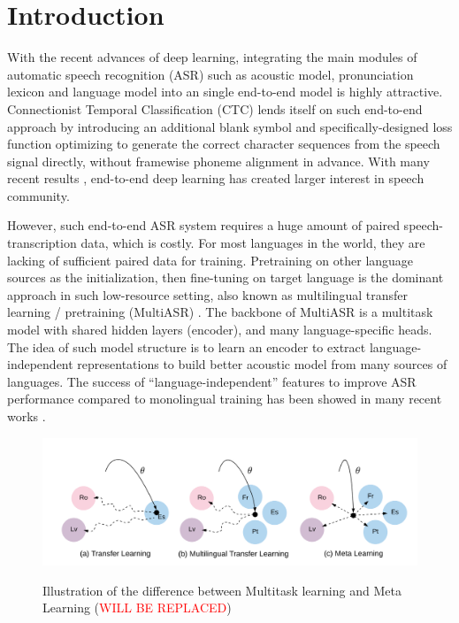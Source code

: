 \section{Introduction}
With the recent advances of deep learning, integrating the main modules of automatic speech recognition (ASR) such as acoustic model, pronunciation lexicon and language model into an single end-to-end model is highly attractive. Connectionist Temporal Classification (CTC) \cite{graves2006connectionist} lends itself on such end-to-end approach by introducing an additional blank symbol and specifically-designed loss function optimizing to generate the correct character sequences from the speech signal directly, without framewise phoneme alignment in advance. With many recent results \cite{hannun2014deep, amodei2016deep, collobert2016wav2letter}, end-to-end deep learning has created larger interest in speech community.

However, such end-to-end ASR system requires a huge amount of paired speech-transcription data, which is costly. For most languages in the world, they are lacking of sufficient paired data for training. Pretraining on other language sources as the initialization, then fine-tuning on target language is the dominant approach in such low-resource setting, also known as multilingual transfer learning / pretraining (MultiASR) \cite{vu2014multilingual, tong2017investigation}. The backbone of MultiASR is a multitask model with shared hidden layers (encoder), and many language-specific heads. The idea of such model structure is to learn an encoder to extract language-independent representations to build better acoustic model from many sources of languages. The success of ``language-independent'' features to improve ASR performance compared to monolingual training has been showed in many recent works \cite{cho2018multilingual, dalmia2018sequence}.

\begin{figure}[t]
  \centering
  \includegraphics[width=\linewidth]{figs/meta_idea.png}
  \label{fig:meta-idea}
  \caption{Illustration of the difference between Multitask learning and Meta Learning (\textcolor{red}{WILL BE REPLACED})}

\vspace{-20pt}
\end{figure}


